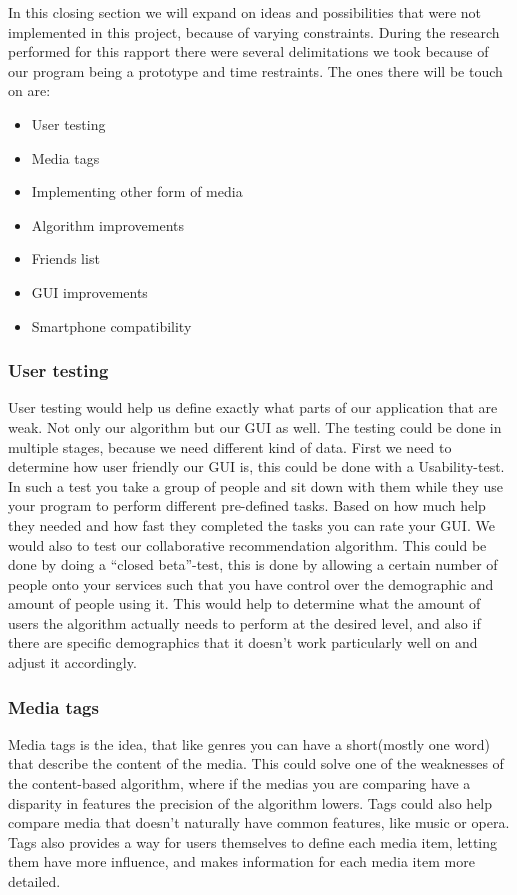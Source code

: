In this closing section we will expand on ideas and possibilities that were not implemented in this project, because of varying constraints. During the research performed for this rapport there were several delimitations we took because of our program being a prototype and time restraints. The ones there will be touch on are:

\begin{itemize}
\item User testing
\item Media tags
\item Implementing other form of media
\item Algorithm improvements
\item Friends list
\item GUI improvements
\item Smartphone compatibility 
\end{itemize}

\subsubsection{User testing}
User testing would help us define exactly what parts of our application that are weak. Not only our algorithm but our GUI as well. The testing could be done in multiple stages, because we need different kind of data. First we need to determine how user friendly our GUI is, this could be done with a Usability-test. In such a test you take a group of people and sit down with them while they use your program to perform different pre-defined tasks. Based on how much help they needed and how fast they completed the tasks you can rate your GUI. We would also to test our collaborative recommendation algorithm. This could be done by doing a “closed beta”-test, this is done by allowing a certain number of people onto your services such that you have control over the demographic and amount of people using it. This would help to determine what the amount of users the algorithm actually needs to perform at the desired level, and also if there are specific demographics that it doesn't work particularly well on and adjust it accordingly.

\subsubsection{Media tags}\label{futureWork:Tags}
Media tags is the idea, that like genres you can have a short(mostly one word) that describe the content of the media. This could solve one of the weaknesses of the content-based algorithm, where if the medias you are comparing have a disparity in features the precision of the algorithm lowers. Tags could also help compare media that doesn't naturally have common features, like music or opera. Tags also provides a way for users themselves to define each media item, letting them have more influence, and makes information for each media item more detailed.

